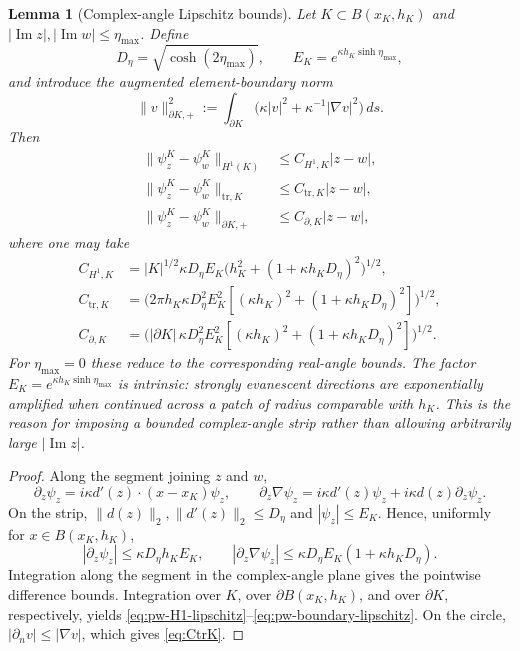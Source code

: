 \documentclass[10pt,a4paper]{amsart}
\newtheorem{lemma}{Lemma}
\renewcommand{\Im}{\operatorname{Im}}
\newcommand{\ii}{i}
\begin{document}
\begin{lemma}[Complex-angle Lipschitz bounds]\label{lem:pw-direction-lipschitz}
Let $K\subset B(x_K,h_K)$ and $|\Im z|,|\Im w|\le\eta_{\max}$.  Define
\[
 D_\eta=\sqrt{\cosh(2\eta_{\max})},
 \qquad E_K=e^{\kappa h_K\sinh\eta_{\max}},
\]
and introduce the augmented element-boundary norm
\begin{equation}\label{eq:boundary-plus-norm}
 \|v\|_{\partial K,+}^2
 :=\int_{\partial K}\big(\kappa|v|^2+\kappa^{-1}|\nabla v|^2\big)\,ds.
\end{equation}
Then
\begin{align}
 \|\psi_z^K-\psi_w^K\|_{H^1(K)}
 &\le C_{H^1,K}|z-w|,\label{eq:pw-H1-lipschitz}\\
 \|\psi_z^K-\psi_w^K\|_{\mathrm{tr},K}
 &\le C_{\mathrm{tr},K}|z-w|,\label{eq:pw-tr-lipschitz}\\
 \|\psi_z^K-\psi_w^K\|_{\partial K,+}
 &\le C_{\partial,K}|z-w|,\label{eq:pw-boundary-lipschitz}
\end{align}
where one may take
\begin{align}
 C_{H^1,K}
 &=|K|^{1/2}\kappa D_\eta E_K
 \Big(h_K^2+(1+\kappa h_KD_\eta)^2\Big)^{1/2},\label{eq:CH1K}\\
 C_{\mathrm{tr},K}
 &=\Big(2\pi h_K\kappa D_\eta^2E_K^2
 [ (\kappa h_K)^2+(1+\kappa h_KD_\eta)^2]\Big)^{1/2},\label{eq:CtrK}\\
 C_{\partial,K}
 &=\Big(|\partial K|\,\kappa D_\eta^2E_K^2
 [ (\kappa h_K)^2+(1+\kappa h_KD_\eta)^2]\Big)^{1/2}.\label{eq:CboundaryK}
\end{align}
For $\eta_{\max}=0$ these reduce to the corresponding real-angle bounds.  The factor $E_K=e^{\kappa h_K\sinh\eta_{\max}}$ is intrinsic: strongly evanescent directions are exponentially amplified when continued across a patch of radius comparable with $h_K$.  This is the reason for imposing a bounded complex-angle strip rather than allowing arbitrarily large $|\Im z|$.
\end{lemma}

\begin{proof}
Along the segment joining $z$ and $w$,
\[
 \partial_z\psi_z=\ii\kappa d'(z)\cdot(x-x_K)\psi_z,
 \qquad
 \partial_z\nabla\psi_z=\ii\kappa d'(z)\psi_z+\ii\kappa d(z)\partial_z\psi_z.
\]
On the strip, $\|d(z)\|_2,\|d'(z)\|_2\le D_\eta$ and $|\psi_z|\le E_K$.  Hence, uniformly for $x\in B(x_K,h_K)$,
\[
 |\partial_z\psi_z|\le \kappa D_\eta h_KE_K,
 \qquad
 |\partial_z\nabla\psi_z|\le \kappa D_\eta E_K(1+\kappa h_KD_\eta).
\]
Integration along the segment in the complex-angle plane gives the pointwise difference bounds.  Integration over $K$, over $\partial B(x_K,h_K)$, and over $\partial K$, respectively, yields \eqref{eq:pw-H1-lipschitz}--\eqref{eq:pw-boundary-lipschitz}.  On the circle, $|\partial_n v|\le|\nabla v|$, which gives \eqref{eq:CtrK}.
\end{proof}
\end{document}
